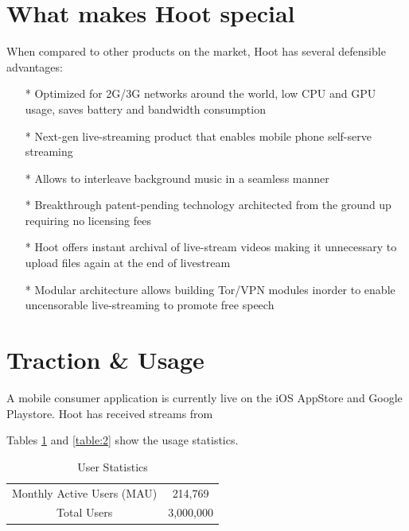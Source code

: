 \documentclass{article}
\begin{document}
\section{What makes Hoot special}
When compared to other products on the market, Hoot has several defensible advantages:
\begin{itemize}
\item[*]Optimized for 2G/3G networks around the world, low CPU and GPU usage, saves battery and bandwidth consumption
\item[*]Next-gen live-streaming product that enables mobile phone self-serve streaming 
\item[*]Allows to interleave background music in a seamless manner
\item[*]Breakthrough patent-pending technology architected from the ground up requiring no licensing fees
\item[*]Hoot offers instant archival of live-stream videos making it unnecessary to upload files again at the end of livestream
\item[*]Modular architecture allows building Tor/VPN modules inorder to enable uncensorable live-streaming to promote free speech
\end{itemize}


\section{Traction \& Usage}
A mobile consumer application is currently live on the iOS AppStore and Google Playstore. Hoot has received streams from 


Tables \ref{table:1} and \ref{table:2} show the usage statistics.

\setlength{\arrayrulewidth}{.7mm}
\setlength{\tabcolsep}{18pt}
\renewcommand{\arraystretch}{2.0} 
 


\begin{table}[!htb]
\centering
\begin{tabular}{ |c|c| }
\hline
\rowcolor{lightgray} \multicolumn{2}{|c|}{User Statistics} \\
\hline
Monthly Active Users (MAU) & 214,769 \\
Total Users & 3,000,000  \\
\hline
\end{tabular}
\caption{User Statistics}
\label{table:1}
\end{table}
\end{document}
